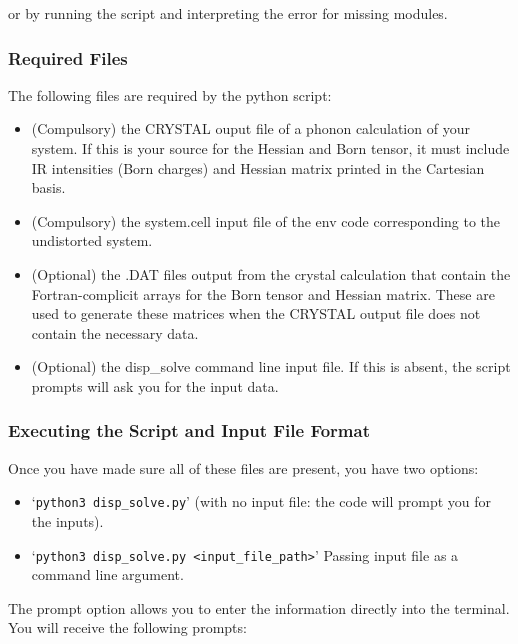 or by running the script and interpreting the error for missing modules.

\subsubsection{Required Files}
The following files are required by the python script:
\begin{itemize}
  \item (Compulsory) the CRYSTAL ouput file of a phonon calculation of your system. If this is your source for the Hessian and Born tensor, it must include IR intensities (Born charges) and Hessian matrix printed in the Cartesian basis.
  \item (Compulsory) the system.cell input file of the env code corresponding to the undistorted system.
  \item (Optional) the .DAT files output from the crystal calculation that contain the Fortran-complicit arrays for the Born tensor and Hessian matrix. These are used to generate these matrices when the CRYSTAL output file does not contain the necessary data.
  \item (Optional) the disp\_solve command line input file. If this is absent, the script prompts will ask you for the input data.  
\end{itemize}

\subsubsection{Executing the Script and Input File Format}
Once you have made sure all of these files are present, you have two options: 
\begin{itemize}
	\item `\texttt{python3 disp\_solve.py}' (with no input file: the code will prompt you for the inputs).
	\item `\texttt{python3 disp\_solve.py <input\_file\_path>}' Passing input file as a command line argument.
\end{itemize}

The prompt option allows you to enter the information directly into the terminal. You will receive the following prompts:

